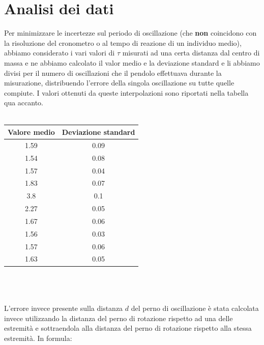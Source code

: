\documentclass{article}
\begin{document}
\section{Analisi dei dati}

\begin{minipage}{0.5\textwidth} \vspace{1cm}
Per minimizzare le incertezze sul periodo di oscillazione (che \textbf{non} coincidono con la risoluzione del cronometro o al tempo di reazione di un individuo medio), abbiamo considerato i vari valori di $\tau$ misurati ad una certa distanza dal centro di massa e ne abbiamo calcolato il valor medio e la deviazione standard e li abbiamo divisi per il numero di oscillazioni che il pendolo effettuava durante la misurazione, distribuendo l'errore della singola oscillazione su tutte quelle compiute. I valori ottenuti da queste interpolazioni sono riportati nella tabella qua accanto. \\ \\
\end{minipage}
\hspace{0.125\textwidth}
\begin{minipage}{0.365\textwidth}
		\begin{tabular}{| c | c |} \hline
			 \textbf{Valore medio} & \textbf{Deviazione standard} \\
			 \hline
			 1.59 & 0.09 \\ \hline
			 1.54 & 0.08 \\ \hline
			 1.57 & 0.04 \\ \hline
			 1.83 & 0.07 \\ \hline
			 3.8 & 0.1 \\ \hline
			 2.27 & 0.05 \\ \hline
			 1.67 & 0.06 \\ \hline
			 1.56 & 0.03 \\ \hline
			 1.57 & 0.06 \\ \hline
			 1.63 & 0.05 \\ \hline
		\end{tabular}
\end{minipage} \\ \\ \\
L'errore invece presente sulla distanza $d$ del perno di oscillazione è stata calcolata invece utilizzando la distanza del perno di rotazione rispetto ad una delle estremità e sottraendola alla distanza del perno di rotazione rispetto alla stessa estremità. In formula:
\end{document}
